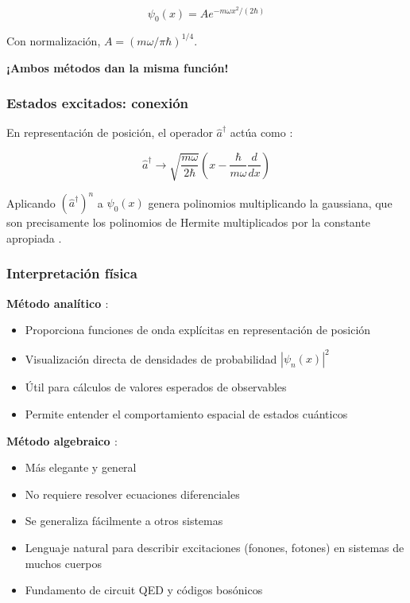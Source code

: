\documentclass[11pt,a4paper,spanish]{book}
\begin{document}
\begin{equation}
	\psi_0(x) = A e^{-m\omega x^2/(2\hbar)}
\end{equation}

Con normalización, $A = (m\omega/\pi\hbar)^{1/4}$.

\textbf{¡Ambos métodos dan la misma función!}

\subsubsection{Estados excitados: conexión}

En representación de posición, el operador $\hat{a}^\dagger$ actúa como \cite{dirac1930}:

\begin{equation}
	\hat{a}^\dagger \to \sqrt{\frac{m\omega}{2\hbar}}\left(x - \frac{\hbar}{m\omega}\frac{d}{dx}\right)
\end{equation}

Aplicando $(\hat{a}^\dagger)^n$ a $\psi_0(x)$ genera polinomios multiplicando la gaussiana, que son precisamente los polinomios de Hermite multiplicados por la constante apropiada \citep{sakurai2020}.

\subsubsection{Interpretación física}

\textbf{Método analítico \citep{schrodinger1926b}} :
\begin{itemize}
	\item Proporciona funciones de onda explícitas en representación de posición
	\item Visualización directa de densidades de probabilidad $|\psi_n(x)|^2$
	\item Útil para cálculos de valores esperados de observables
	\item Permite entender el comportamiento espacial de estados cuánticos
\end{itemize}

\textbf{Método algebraico \citep{dirac1930}} :
\begin{itemize}
	\item Más elegante y general
	\item No requiere resolver ecuaciones diferenciales
	\item Se generaliza fácilmente a otros sistemas
	\item Lenguaje natural para describir excitaciones (fonones, fotones) en sistemas de muchos cuerpos
	\item Fundamento de circuit QED y códigos bosónicos \citep{blais2021}
\end{itemize}
\end{document}
